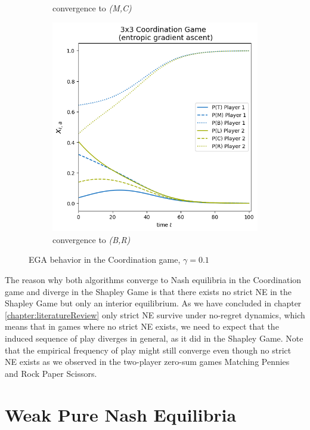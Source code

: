 \begin{figure}[H]
\begin{subfigure}{.5\textwidth}
    \caption{convergence to \textit{(M,C)}}
    \label{fig:Coordination3x3b}
\end{subfigure}
\begin{subfigure}{.5\textwidth}
    \centering
    \includegraphics[width=\textwidth]{logos/Coordination3x3-3.png}
    \caption{convergence to \textit{(B,R)}}
    \label{fig:Coordination3x3c}
\end{subfigure}%
\caption{EGA behavior in the Coordination game, $\gamma = 0.1$}
\label{fig:Coordination3x3}
\end{figure}


The reason why both algorithms converge to Nash equilibria in the Coordination game and diverge in the Shapley Game is that there exists no strict NE in the Shapley Game but only an interior equilibrium. As we have concluded in chapter \ref{chapter:literatureReview} only strict NE survive under no-regret dynamics, which means that in games where no strict NE exists, we need to expect that the induced sequence of play diverges in general, as it did in the Shapley Game. Note that the empirical frequency of play might still converge even though no strict NE exists as we observed in the two-player zero-sum games Matching Pennies and Rock Paper Scissors. 


\section{Weak Pure Nash Equilibria}\label{section:WeakPureNashEquilibria}

